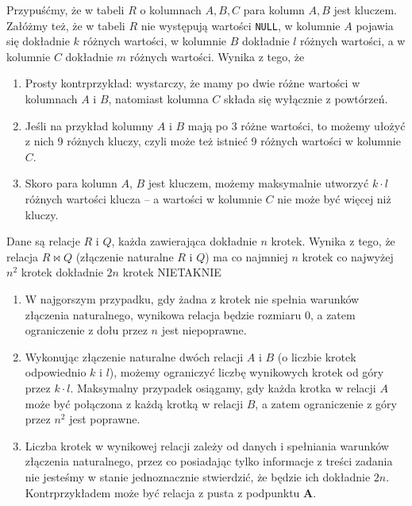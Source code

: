 \begin{solutions}
    \sol Przypuśćmy, że w tabeli $R$ o kolumnach $A, B, C$ para kolumn $A, B$ jest kluczem. Załóżmy też, że w tabeli $R$ nie występują wartości \texttt{NULL}, w kolumnie $A$ pojawia się dokładnie $k$ różnych wartości, w kolumnie $B$ dokładnie $l$ różnych wartości, a w kolumnie $C$ dokładnie $m$ różnych wartości. Wynika z tego, że 
    
    \begin{enumerate}[\bf A.]
    	\item Prosty kontrprzykład: wystarczy, że mamy po dwie różne wartości w kolumnach $A$ i $B$, natomiast kolumna $C$ składa się wyłącznie z powtórzeń.
    	\item Jeśli na przykład kolumny $A$ i $B$ mają po 3 różne wartości, to możemy ułożyć z nich 9 różnych kluczy, czyli może też istnieć 9 różnych wartości w kolumnie $C$.
    	\item Skoro para kolumn $A$, $B$ jest kluczem, możemy maksymalnie utworzyć $k \cdot l$ różnych wartości klucza -- a wartości w kolumnie $C$ nie może być więcej niż kluczy. 
    \end{enumerate}

    \sol Dane są relacje $R$ i $Q$, każda zawierająca dokładnie $n$ krotek. Wynika z tego, że relacja $R \bowtie Q$ (złączenie naturalne $R$ i $Q$) ma
    \answerss
    {co najmniej $n$ krotek}
    {co najwyżej $n^2$ krotek}
    {dokładnie $2n$ krotek}
    {NIE}{TAK}{NIE}

    \begin{enumerate}[\bf A.]
        \item W najgorszym przypadku, gdy żadna z krotek nie spełnia warunków złączenia naturalnego, wynikowa relacja będzie rozmiaru 0, a zatem ograniczenie z dołu przez $n$ jest niepoprawne.
        \item Wykonując złączenie naturalne dwóch relacji $A$ i $B$ (o liczbie krotek odpowiednio $k$ i $l$), możemy ograniczyć liczbę wynikowych krotek od góry przez $k \cdot l$. Maksymalny przypadek osiągamy, gdy każda krotka w relacji $A$ może być połączona z każdą krotką w relacji $B$, a zatem ograniczenie z góry przez $n^2$ jest poprawne.
        \item Liczba krotek w wynikowej relacji zależy od danych i spełniania warunków złączenia naturalnego, przez co posiadając tylko informacje z treści zadania nie jesteśmy w stanie jednoznacznie stwierdzić, że będzie ich dokładnie $2n$. Kontrprzykładem może być relacja z pusta z podpunktu \textbf{A}.
    \end{enumerate}


\end{solutions}
